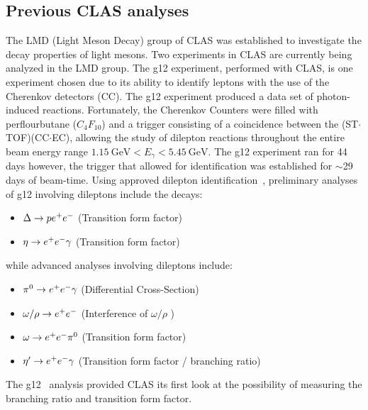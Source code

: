 	\subsection{Previous CLAS analyses}
	The LMD (Light Meson Decay) group of CLAS was established to investigate the decay properties of light mesons. Two experiments in CLAS are currently being analyzed in the LMD group. The g12 experiment, performed with CLAS, is one experiment chosen due to its ability to identify leptons with the use of the Cherenkov detectors (CC).
	The g12 experiment produced a data set of photon-induced reactions. Fortunately, the Cherenkov Counters were filled with perflourbutane ($C_4F_{10}$) and a trigger consisting of a coincidence between the (ST$\cdot$TOF)(CC$\cdot$EC), allowing the study of dilepton reactions throughout the entire beam energy range $1.15 \ \mathrm{GeV}<E_\gamma <5.45 \ \mathrm{GeV}$. The g12 experiment ran for 44 days however, the trigger that allowed for \epemT identification was established for $\sim$29 days of beam-time. Using approved dilepton identification~\cite{g12note}, preliminary analyses of g12 involving dileptons include the decays:
	\begin{itemize}
		\item $\Delta \to p e^+e^-$ (Transition form factor)
		\item $\eta \to e^+e^- \gamma$ (Transition form factor)
	\end{itemize}
	while advanced analyses involving dileptons include:
	\begin{itemize}
		\item $\pi^{0} \to e^+e^- \gamma$ (Differential Cross-Section)
		\item $\omega / \rho \to e^+e^-$ (Interference of $\omega/\rho$ )
		\item $\omega \to e^+e^- \pi^{0}$ (Transition form factor)
		\item $\eta^{\prime} \to e^+e^- \gamma$ (Transition form factor / branching ratio)
	\end{itemize}
	The g12 \etaPDal \ analysis provided CLAS its first look at the possibility of measuring the branching ratio and transition form factor. 
